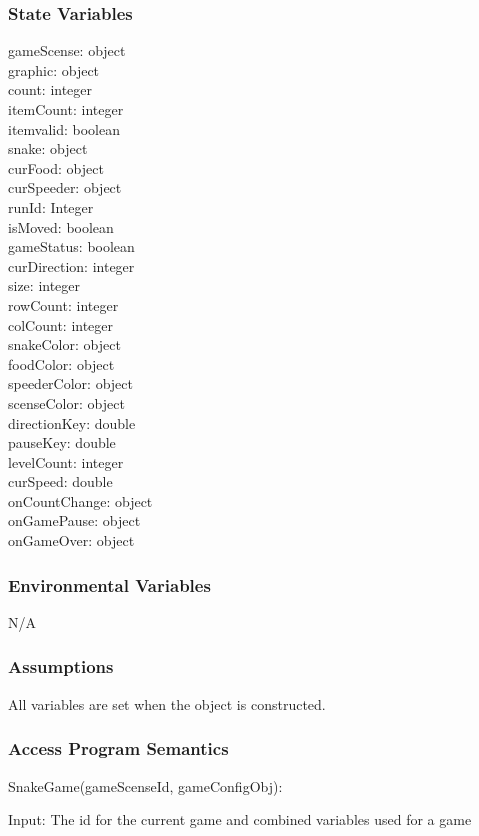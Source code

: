 \documentclass[12pt, titlepage]{article}
\begin{document}
		\subsubsection{State Variables}
		gameScense: object\\
		graphic: object\\
		count: integer\\
		itemCount: integer\\
		itemvalid: boolean\\
		snake: object\\
		curFood: object\\
		curSpeeder: object\\
		runId: Integer\\
		isMoved: boolean\\
		gameStatus: boolean\\
		curDirection: integer\\
		size: integer\\
		rowCount: integer\\
		colCount: integer\\
		snakeColor: object\\
		foodColor: object\\
		speederColor: object\\
		scenseColor: object\\
		directionKey: double\\
		pauseKey: double\\
		levelCount: integer\\
		curSpeed: double\\
		onCountChange: object\\
		onGamePause: object\\
		onGameOver: object
		\subsubsection{Environmental Variables}
		N/A
		\subsubsection{Assumptions}
		All variables are set when the object is constructed.
		\subsubsection{Access Program Semantics}
		SnakeGame(gameScenseId, gameConfigObj):
		
		Input: The id for the current game and combined variables used for a game
		
\end{document}
